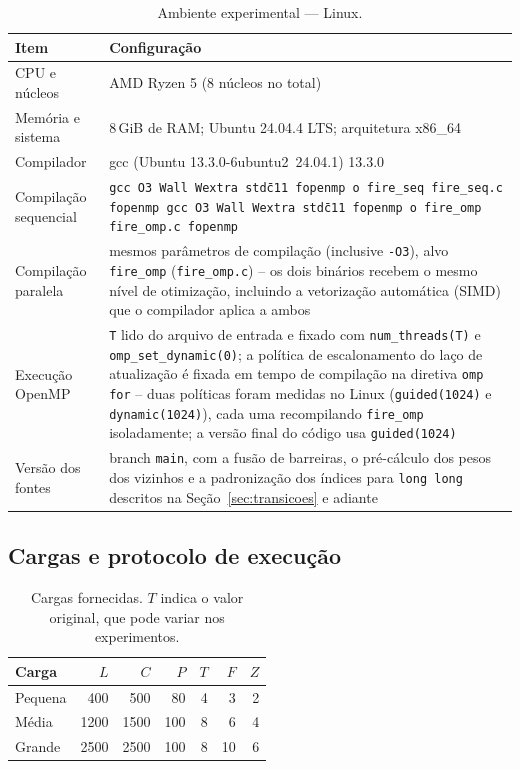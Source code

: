\documentclass[12pt,a4paper]{article}
\begin{document}
\begin{table}[H]
\centering
\caption{Ambiente experimental --- Linux.}
\begin{tabularx}{\linewidth}{lX}
\toprule
\textbf{Item} & \textbf{Configuração} \\
\midrule
CPU e núcleos & AMD Ryzen 5 (8 núcleos no total) \\
Memória e sistema & 8\,GiB de RAM; Ubuntu 24.04.4 LTS; arquitetura x86\_64 \\
Compilador & gcc (Ubuntu 13.3.0-6ubuntu2~24.04.1) 13.3.0 \\
Compilação sequencial & \texttt{gcc \-O3 \-Wall \-Wextra \-std\=c11 \-fopenmp \-o fire\_seq fire\_seq.c \-fopenmp
gcc \-O3 \-Wall \-Wextra \-std\=c11 \-fopenmp \-o fire\_omp fire\_omp.c \-fopenmp
} \\
Compilação paralela & mesmos parâmetros de compilação (inclusive \texttt{-O3}), alvo \texttt{fire\_omp} (\texttt{fire\_omp.c}) -- os dois binários recebem o mesmo nível de otimização, incluindo a vetorização automática (SIMD) que o compilador aplica a ambos \\
Execução OpenMP & \texttt{T} lido do arquivo de entrada e fixado com \texttt{num\_threads(T)} e \texttt{omp\_set\_dynamic(0)}; a política de escalonamento do laço de atualização é fixada em tempo de compilação na diretiva \texttt{omp for} -- duas políticas foram medidas no Linux (\texttt{guided(1024)} e \texttt{dynamic(1024)}), cada uma recompilando \texttt{fire\_omp} isoladamente; a versão final do código usa \texttt{guided(1024)} \\
Versão dos fontes & branch \texttt{main}, com a fusão de barreiras, o
pré-cálculo dos pesos dos vizinhos e a padronização dos índices para
\texttt{long long} descritos na Seção~\ref{sec:transicoes} e adiante \\
\bottomrule
\end{tabularx}
\end{table}

\subsection{Cargas e protocolo de execução}
\begin{table}[H]
\centering
\caption{Cargas fornecidas. $T$ indica o valor original, que pode variar nos experimentos.}
\begin{tabular}{lrrrrrr}
\toprule
\textbf{Carga} & $L$ & $C$ & $P$ & $T$ & $F$ & $Z$ \\
\midrule
Pequena & 400 & 500 & 80 & 4 & 3 & 2 \\
Média & 1200 & 1500 & 100 & 8 & 6 & 4 \\
Grande & 2500 & 2500 & 100 & 8 & 10 & 6 \\
\bottomrule
\end{tabular}
\end{table}
\end{document}
